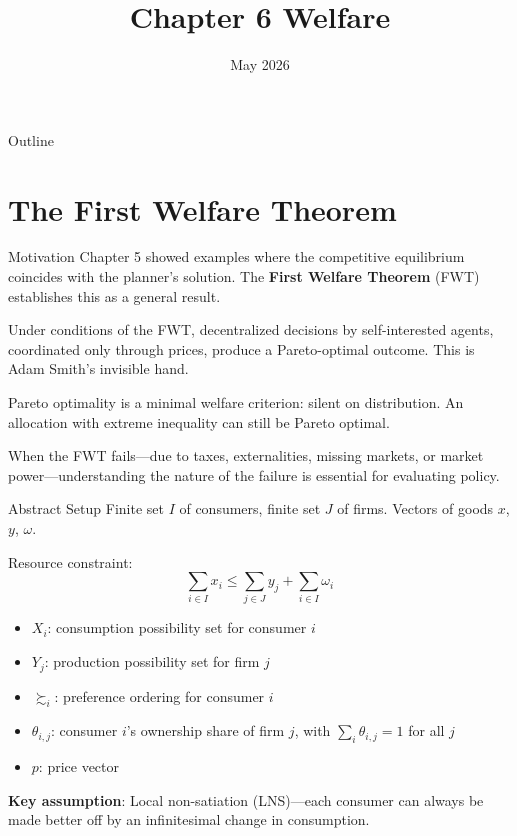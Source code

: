 \documentclass[blue]{beamer}
\title[Chapter6]{Chapter 6 Welfare}
\author[]{}
\date[May 2026]{May 2026}
\begin{document}
  \frame
  {
    \titlepage
  }


\begin{frame}{Outline}
	\tableofcontents
\end{frame}

\section{The First Welfare Theorem}

\begin{frame}{Motivation}
	Chapter 5 showed examples where the competitive equilibrium coincides with the planner's solution. The \textbf{First Welfare Theorem} (FWT) establishes this as a general result.
	
	\bigskip
	Under conditions of the FWT, decentralized decisions by self-interested agents, coordinated only through prices, produce a Pareto-optimal outcome. This is Adam Smith's invisible hand.
	
	\bigskip
	Pareto optimality is a minimal welfare criterion: silent on distribution. An allocation with extreme inequality can still be Pareto optimal.
	
	\bigskip
	When the FWT fails---due to taxes, externalities, missing markets, or market power---understanding the nature of the failure is essential for evaluating policy.
\end{frame}

\begin{frame}{Abstract Setup}
	Finite set $I$ of consumers, finite set $J$ of firms. Vectors of goods $x$, $y$, $\omega$.
	

	Resource constraint:
	\[
	\sum_{i \in I} x_i \leq \sum_{j \in J} y_j + \sum_{i \in I} \omega_i
	\]
	\vspace{-18pt}
	\begin{itemize}
		\item $X_i$: consumption possibility set for consumer $i$
		\item $Y_j$: production possibility set for firm $j$
		\item $\succsim_i$: preference ordering for consumer $i$
		\item $\theta_{i,j}$: consumer $i$'s ownership share of firm $j$, with $\sum_{i} \theta_{i,j} = 1$ for all $j$
		\item $p$: price vector
	\end{itemize}
	

	\textbf{Key assumption}: Local non-satiation (LNS)---each consumer can always be made better off by an infinitesimal change in consumption.
\end{frame}
\end{document}
